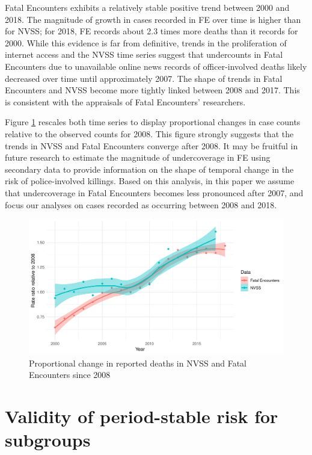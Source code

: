 \documentclass{article}
\begin{document}
Fatal Encounters exhibits a relatively stable positive trend between 2000 and 2018. The magnitude of growth in cases recorded in FE over time is higher than for NVSS; for 2018, FE records about 2.3 times more deaths than it records for 2000. While this evidence is far from definitive, trends in the proliferation of internet access and the NVSS time series suggest that undercounts in Fatal Encounters due to unavailable online news records of officer-involved deaths likely decreased over time until approximately 2007. The shape of trends in Fatal Encounters and NVSS become more tightly linked between 2008 and 2017. This is consistent with the appraisals of Fatal Encounters' researchers. 

Figure \ref{fig:pct_08} rescales both time series to display proportional changes in case counts relative to the observed counts for 2008. This figure strongly suggests that the trends in NVSS and Fatal Encounters converge after 2008. It may be fruitful in future research to estimate the magnitude of undercoverage in FE using secondary data to provide information on the shape of temporal change in the risk of police-involved killings. Based on this analysis, in this paper we assume that undercoverage in Fatal Encounters becomes less pronounced after 2007, and focus our analyses on cases recorded as occurring between 2008 and 2018. 

\begin{figure}
	\centering
	\includegraphics[width = \linewidth]{vis/nvss_fe_pct_08.pdf}
	\caption{Proportional change in reported deaths in NVSS and Fatal Encounters since 2008}
	\label{fig:pct_08}
\end{figure}

\section{Validity of period-stable risk for subgroups}
\end{document}
